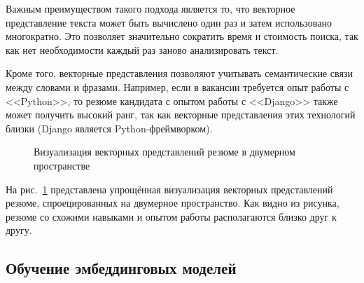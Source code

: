 \documentclass[14pt]{mmcs_article}
\begin{document}
Важным преимуществом такого подхода является то, что векторное представление текста может быть вычислено один раз и затем использовано многократно. Это позволяет значительно сократить время и стоимость поиска, так как нет необходимости каждый раз заново анализировать текст.

Кроме того, векторные представления позволяют учитывать семантические связи между словами и фразами. Например, если в вакансии требуется опыт работы с <<Python>>, то резюме кандидата с опытом работы с <<Django>> также может получить высокий ранг, так как векторные представления этих технологий близки (Django является Python-фреймворком).

\begin{figure}[h]
  \centering
  \caption{\centering Визуализация векторных представлений резюме в двумерном пространстве}
  \label{fig:embedding_visualization}
\end{figure}

На рис.~\ref{fig:embedding_visualization} представлена упрощённая визуализация векторных представлений резюме, спроецированных на двумерное пространство. Как видно из рисунка, резюме со схожими навыками и опытом работы располагаются близко друг к другу.

\subsection{Обучение эмбеддинговых моделей}
\end{document}
